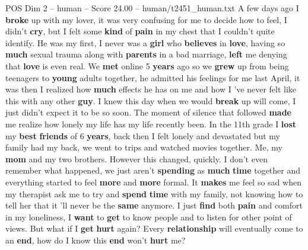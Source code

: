 \begin{textsample}{POS Dim 2 – human – Score 24.00 – human/t2451\_human.txt}  \label{ex:f2_pos_024}
A few days ago I \textbf{broke} up with my lover, it was very confusing for me to decide how to feel, I didn't \textbf{cry}, but I felt some \textbf{kind} of \textbf{pain} in my chest that I couldn't quite identify.
He was my first, I never was a \textbf{girl} who \textbf{believes} in \textbf{love}, having so \textbf{much} sexual trauma along with \textbf{parents} in a bad marriage, \textbf{left} me denying that \textbf{love} is even real.
We \textbf{met} online 5 \textbf{years} ago so we \textbf{grew} up from being teenagers to \textbf{young} adults together, he admitted his feelings for me last April, it was then I realized how \textbf{much} effects he has on me and how I ’ve never felt like this with any other \textbf{guy}.
I knew this day when we would \textbf{break} up will come, I just didn't expect it to be so soon.
The moment of silence that followed \textbf{made} me realize how lonely my life has my life recently been.
In the 11th grade I \textbf{lost} my \textbf{best} \textbf{friends} of 6 \textbf{years}, back then I felt lonely and devastated but my family had my back, we went to trips and watched movies together.
Me, my \textbf{mom} and my two brothers.
However this changed, quickly.
I don't even remember what happened, we just aren't \textbf{spending} as \textbf{much} \textbf{time} together and everything started to feel \textbf{more} and \textbf{more} formal.
It \textbf{makes} me feel so sad when my therapist ask me to try and \textbf{spend} \textbf{time} with my family, not knowing how to tell her that it ’ll never be the \textbf{same} anymore.
I just \textbf{find} both \textbf{pain} and comfort in my loneliness, I \textbf{want} to \textbf{get} to know people and to listen for other point of views.
But what if I \textbf{get} \textbf{hurt} again?
Every \textbf{relationship} will eventually come to an \textbf{end}, how do I know this \textbf{end} won't \textbf{hurt} me?

\end{textsample}
